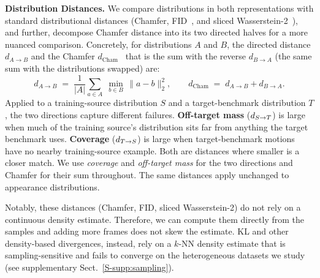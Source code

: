 \noindent\textbf{Distribution Distances.}
We compare distributions in both representations with standard distributional distances (Chamfer,
FID~\cite{heusel2018ganstrainedtimescaleupdate}, and sliced Wasserstein-2~\cite{bonneel2015sliced}), and
further, decompose Chamfer distance into its two directed halves for a more nuanced comparison. Concretely, for distributions $A$ and $B$, the
directed distance $d_{A \to B}$ and the Chamfer
$d_{\mathrm{Cham}}$~\cite{fan2017pointcloud} that is the sum with the reverse
$d_{B \to A}$ (the same sum with the distributions swapped) are:
\begin{equation}
d_{A \to B} \;=\; \frac{1}{|A|}\sum_{a \in A}\; \min_{b \in B}\,
\lVert a - b \rVert_2^2,
\qquad
d_{\mathrm{Cham}} \;=\; d_{A \to B} + d_{B \to A}.
\label{eq:dirdist}
\end{equation}
Applied to a training-source distribution $S$ and a target-benchmark distribution $T$, the two
directions capture different failures. \textbf{Off-target mass} ($d_{S\to T}$) is large when
much of the training source's distribution sits far from anything the target benchmark
uses. \textbf{Coverage} ($d_{T\to S}$) is large when target-benchmark motions have no nearby
training-source example. Both are distances where
smaller is a closer match. We use
\emph{coverage} and \emph{off-target mass} for the two directions and Chamfer for
their sum throughout. The same distances apply unchanged to appearance
distributions.

Notably, these distances (Chamfer, FID, sliced Wasserstein-2) do not rely on a continuous density estimate. Therefore, we can compute them directly from the samples and adding more frames does not skew the estimate. KL and other density-based divergences, instead, rely on a $k$-NN density estimate that is sampling-sensitive and fails to converge on the heterogeneous datasets we study (see supplementary Sect.~\ref{S-supp:sampling}).
